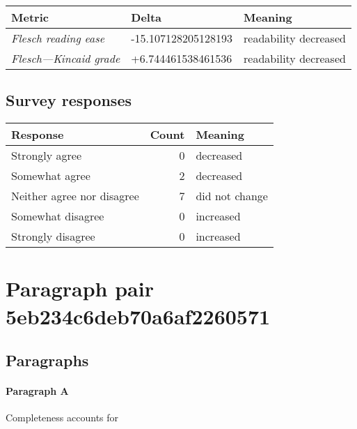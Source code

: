 \begin{tabular}{lll}
\toprule
               \textbf{Metric} &       \textbf{Delta} &       \textbf{Meaning} \\
\midrule
    \emph{Flesch reading ease} &  -15.107128205128193 &  readability decreased \\
 \emph{Flesch---Kincaid grade} &   +6.744461538461536 &  readability decreased \\
\bottomrule
\end{tabular}

\subsection{Survey responses}
\begin{tabular}{lrl}
\toprule
          \textbf{Response} &  \textbf{Count} & \textbf{Meaning} \\
\midrule
             Strongly agree &               0 &        decreased \\
             Somewhat agree &               2 &        decreased \\
 Neither agree nor disagree &               7 &   did not change \\
          Somewhat disagree &               0 &        increased \\
          Strongly disagree &               0 &        increased \\
\bottomrule
\end{tabular}

\section{Paragraph pair 5eb234c6deb70a6af2260571}
\subsection{Paragraphs}
\paragraph{Paragraph A}
Completeness accounts for %

